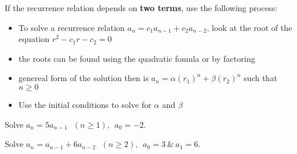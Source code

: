 If the recurrence relation depends on \textbf{two terms}, use the following process:

\begin{itemize}
    \item To solve a recurrence relation $a_n=c_1a_{n-1} + c_2a_{n-2}$, look at the root of the equation $r^2-c_1r-c_2=0$
    \item the roots can be found using the quadratic fomula or by factoring
    \item genereal form of the solution then is $a_n=\alpha (r_1)^n + \beta (r_2)^n$ such that $n \ge 0$
    \item Use the initial conditions to solve for $\alpha$ and $\beta$
\end{itemize}


\begin{problem}
    Solve $a_n = 5a_{n-1}\:\:\:(n\ge 1),\:\: a_0 = -2$.
\end{problem}

\begin{problem}
    Solve $a_n = a_{n-1}+6a_{n-2}\:\:\:(n\ge 2),\:\: a_0 = 3 \:\&\: a_1 = 6$.
\end{problem}